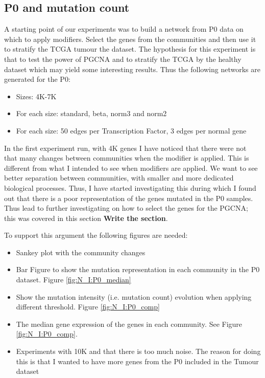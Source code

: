 

\subsection{P0 and mutation count}

A starting point of our experiments was to build a network from P0 data on which to apply modifiers. Select the genes from the communities and then use it to stratify the TCGA tumour the dataset. The hypothesis for this experiment is that to test the power of PGCNA and to stratify the TCGA by the healthy dataset which may yield some interesting results. Thus the following networks are generated for the P0:

\begin{itemize}
    \item Sizes: 4K-7K
    \item For each size: standard, beta, norm3 and norm2
    \item For each size: 50 edges per Transcription Factor, 3 edges per normal gene
\end{itemize}


In the first experiment run, with 4K genes I have noticed that there were not that many changes between communities when the modifier is applied. This is different from what I intended to see when modifiers are applied. We want to see better separation between communities, with smaller and more dedicated biological processes. Thus, I have started investigating this during which I found out that there is a poor representation of the genes mutated in the P0 samples. Thus lead to further investigating on how to select the genes for the PGCNA; this was covered in this section \textbf{Write the section}.

To support this argument the following figures are needed:
\begin{itemize}
    \item Sankey plot with the community changes 
    \item Bar Figure to show the mutation representation in each community in the P0 dataset. Figure \ref{fig:N_I:P0_median}
    \item Show the mutation intensity (i.e. mutation count) evolution when applying different threshold.  Figure \ref{fig:N_I:P0_comp}
    \item The median gene expression of the genes in each community. See Figure \ref{fig:N_I:P0_comp}.
    \item Experiments with 10K and that there is too much noise. The reason for doing this is that I wanted to have more genes from the P0 included in the Tumour dataset
\end{itemize}

